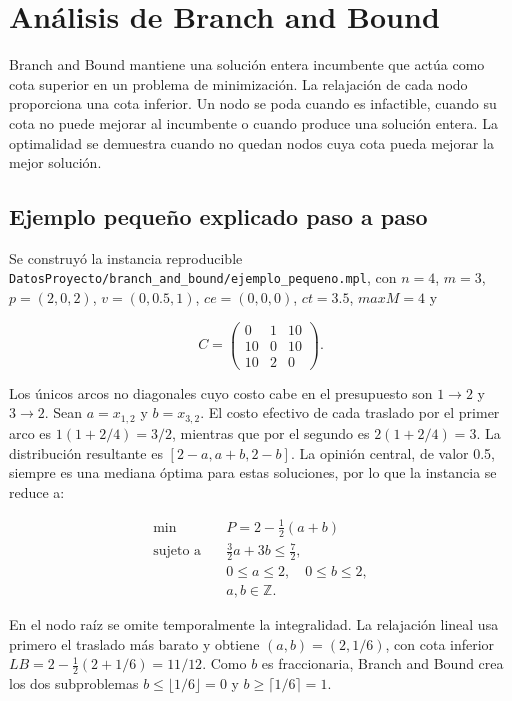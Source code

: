 \documentclass[11pt,letterpaper]{article}
\begin{document}
\section{Análisis de Branch and Bound}

Branch and Bound mantiene una solución entera incumbente que actúa como cota
superior en un problema de minimización. La relajación de cada nodo
proporciona una cota inferior. Un nodo se poda cuando es infactible, cuando
su cota no puede mejorar al incumbente o cuando produce una solución entera.
La optimalidad se demuestra cuando no quedan nodos cuya cota pueda mejorar
la mejor solución.

\subsection{Ejemplo pequeño explicado paso a paso}

Se construyó la instancia reproducible
\texttt{DatosProyecto/branch\_and\_bound/ejemplo\_pequeno.mpl}, con
\(n=4\), \(m=3\), \(p=(2,0,2)\), \(v=(0,0.5,1)\), \(ce=(0,0,0)\),
\(ct=3.5\), \(maxM=4\) y

\[
C=\begin{pmatrix}
0&1&10\\
10&0&10\\
10&2&0
\end{pmatrix}.
\]

Los únicos arcos no diagonales cuyo costo cabe en el presupuesto son
\(1\to2\) y \(3\to2\). Sean \(a=x_{1,2}\) y \(b=x_{3,2}\). El costo efectivo
de cada traslado por el primer arco es
\(1(1+2/4)=3/2\), mientras que por el segundo es
\(2(1+2/4)=3\). La distribución resultante es
\([2-a,a+b,2-b]\). La opinión central, de valor 0.5, siempre es una mediana
óptima para estas soluciones, por lo que la instancia se reduce a:

\[
\begin{aligned}
\min\quad & P=2-\tfrac{1}{2}(a+b)\\
\text{sujeto a}\quad
& \tfrac{3}{2}a+3b\le \tfrac{7}{2},\\
&0\le a\le2,\quad 0\le b\le2,\\
&a,b\in\mathbb{Z}.
\end{aligned}
\]

En el nodo raíz se omite temporalmente la integralidad. La relajación lineal
usa primero el traslado más barato y obtiene
\((a,b)=(2,1/6)\), con cota inferior
\(LB=2-\tfrac12(2+1/6)=11/12\). Como \(b\) es fraccionaria, Branch and Bound
crea los dos subproblemas \(b\le\lfloor1/6\rfloor=0\) y
\(b\ge\lceil1/6\rceil=1\).
\end{document}

